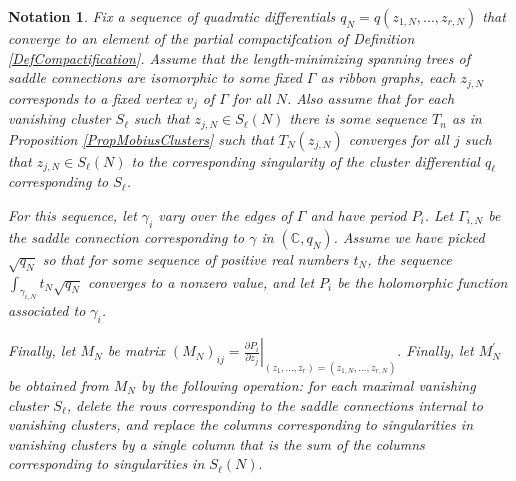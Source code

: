 \documentclass[12pt]{article}
\newtheorem{notation}[theorem]{Notation}
\newcommand{\cc}{\mathbb{C}}
\begin{document}
\begin{notation}\label{NotaCompactConverge}
Fix a sequence of quadratic differentials $q_N = q(z_{1,N},...,z_{r,N})$ that converge to an element of the partial compactifcation of Definition \ref{DefCompactification}. Assume that the length-minimizing spanning trees of saddle connections are isomorphic to some fixed $\Gamma$ as ribbon graphs, each $z_{j,N}$ corresponds to a fixed vertex $v_j$ of $\Gamma$ for all $N$. Also assume that for each vanishing cluster $S_\ell$ such that $z_{j,N} \in S_\ell(N)$ there is some sequence $T_n$ as in Proposition \ref{PropMobiusClusters} such that $T_N(z_{j,N})$ converges for all $j$ such that $z_{j,N} \in S_\ell(N)$ to the corresponding singularity of the cluster differential $q_\ell$ corresponding to $S_\ell$.

For this sequence, let $\gamma_i$ vary over the edges of $\Gamma$ and have period $P_i$. Let $\Gamma_{i,N}$ be the saddle connection corresponding to $\gamma$ in $(\cc,q_N)$. Assume we have picked $\sqrt{q_N}$ so that for some sequence of positive real numbers $t_N$, the sequence $\int_{\gamma_{i,N}} t_N \sqrt{q_N}$ converges to a nonzero value, and let $P_i$ be the holomorphic function associated to $\gamma_i$.

Finally, let $M_N$ be matrix $(M_N)_{ij} = \left.\frac{\partial P_i}{\partial z_j}\right|_{(z_1,...,z_r) = (z_{1,N},...,z_{r,N})}.$ Finally, let $M_N^\prime$ be obtained from $M_N$ by the following operation: for each maximal vanishing cluster $S_\ell$, delete the rows corresponding to the saddle connections internal to vanishing clusters, and replace the columns corresponding to singularities in vanishing clusters by a single column that is the sum of the columns corresponding to singularities in $S_\ell(N).$\end{notation}
\end{document}
